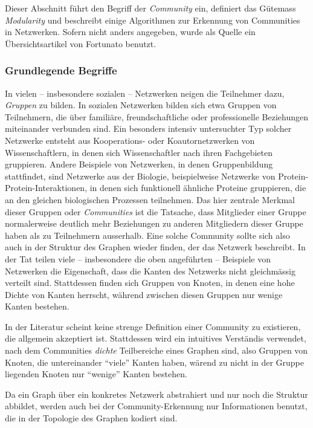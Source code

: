 Dieser Abschnitt f\"uhrt den Begriff der \emph{Community} ein,
definiert das G\"utemass \emph{Modularity} und beschreibt einige
Algorithmen zur Erkennung von Communities in Netzwerken. Sofern nicht
anders angegeben, wurde als Quelle ein \"Ubersichtsartikel von
Fortunato \cite{Fortunato2010} benutzt.

\subsubsection{Grundlegende Begriffe}
\label{sec:grundl-begr}

In vielen -- insbesondere sozialen -- Netzwerken neigen die Teilnehmer
dazu, \emph{Gruppen} zu bilden. In sozialen Netzwerken bilden sich
etwa Gruppen von Teilnehmern, die \"uber famili\"are,
freundschaftliche oder professionelle Beziehungen miteinander
verbunden sind. Ein besonders intensiv untersuchter Typ solcher
Netzwerke entsteht aus Kooperations- oder Koautornetzwerken von
Wissenschaftlern, in denen sich Wissenschaftler nach ihren
Fachgebieten gruppieren. Andere Beispiele von Netzwerken, in denen
Gruppenbildung stattfindet, sind Netzwerke aus der Biologie,
beispielweise Netzwerke von Protein-Protein-Interaktionen, in denen
sich funktionell \"ahnliche Proteine gruppieren, die an den gleichen
biologischen Prozessen teilnehmen. Das hier zentrale Merkmal dieser
Gruppen oder \emph{Communities} ist die Tatsache, dass Mitglieder
einer Gruppe normalerweise deutlich mehr Beziehungen zu anderen
Mitgliedern dieser Gruppe haben als zu Teilnehmern ausserhalb. Eine
solche Community sollte sich also auch in der Struktur des Graphen
wieder finden, der das Netzwerk beschreibt. In der Tat teilen viele --
insbesondere die oben angef\"uhrten -- Beispiele von Netzwerken die
Eigenschaft, dass die Kanten des Netzwerks nicht gleichm\"assig
verteilt sind. Stattdessen finden sich Gruppen von Knoten, in denen
eine hohe Dichte von Kanten herrscht, w\"ahrend zwischen diesen
Gruppen nur wenige Kanten bestehen.

In der Literatur scheint keine strenge Definition einer Community zu
existieren, die allgemein akzeptiert ist. Stattdessen wird ein
intuitives Verst\"andis verwendet, nach dem Communities \emph{dichte}
Teilbereiche eines Graphen sind, also Gruppen von Knoten, die
untereinander ``viele'' Kanten haben, w\"arend zu nicht in der Gruppe
liegenden Knoten nur ``wenige'' Kanten bestehen.

Da ein Graph \"uber ein konkretes Netzwerk abstrahiert und nur noch
die Struktur abbildet, werden auch bei der Community-Erkennung nur
Informationen benutzt, die in der Topologie des Graphen kodiert sind. 

